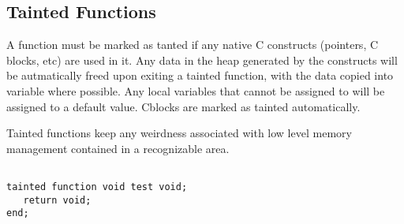 \documentclass{article}
\begin{document}
\subsection{Tainted Functions}
A function must be marked as tanted if any native C constructs (pointers, C blocks, etc) are used in it. Any data in the heap generated by the constructs will be autmatically freed upon exiting a tainted function, with the data copied into variable where possible. Any local variables that cannot be assigned to will be assigned to a default value. Cblocks are marked as tainted automatically. \par
Tainted functions keep any weirdness associated with low level memory management contained in a recognizable area. 

\begin{verbatim}

tainted function void test void; 
   return void;
end;


\end{verbatim}
\end{document}
